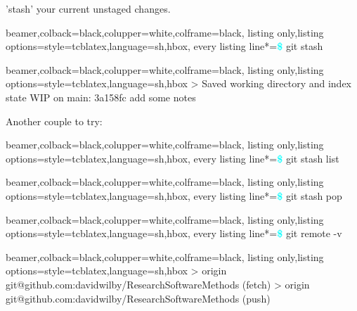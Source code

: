 \documentclass{beamer} %
\begin{document}
  \begin{frame}[fragile]
    'stash' your current unstaged changes.\newline
    \begin{tcblisting}{beamer,colback=black,colupper=white,colframe=black,
      listing only,listing options={style=tcblatex,language=sh},hbox,
      every listing line*={\textcolor{cyan}{\small\ttfamily\bfseries\$}}}
  git stash
    \end{tcblisting}
    
    \begin{tcblisting}{beamer,colback=black,colupper=white,colframe=black,
      listing only,listing options={style=tcblatex,language=sh},hbox}
> Saved working directory and index state WIP on main: 3a158fc add some notes
    \end{tcblisting}

    Another couple to try:
    \begin{tcblisting}{beamer,colback=black,colupper=white,colframe=black,
      listing only,listing options={style=tcblatex,language=sh},hbox,
      every listing line*={\textcolor{cyan}{\small\ttfamily\bfseries\$}}}
  git stash list
    \end{tcblisting}

    \begin{tcblisting}{beamer,colback=black,colupper=white,colframe=black,
      listing only,listing options={style=tcblatex,language=sh},hbox,
      every listing line*={\textcolor{cyan}{\small\ttfamily\bfseries\$}}}
  git stash pop
    \end{tcblisting}
    
  \end{frame}

  \begin{frame}[fragile]
    
    \begin{tcblisting}{beamer,colback=black,colupper=white,colframe=black,
      listing only,listing options={style=tcblatex,language=sh},hbox,
      every listing line*={\textcolor{cyan}{\small\ttfamily\bfseries\$}}}
  git remote -v
    \end{tcblisting}
    
    \begin{tcblisting}{beamer,colback=black,colupper=white,colframe=black,
      listing only,listing options={style=tcblatex,language=sh},hbox}
> origin git@github.com:davidwilby/ResearchSoftwareMethods (fetch)
> origin git@github.com:davidwilby/ResearchSoftwareMethods (push)
    \end{tcblisting}

  \end{frame}
\end{document}
